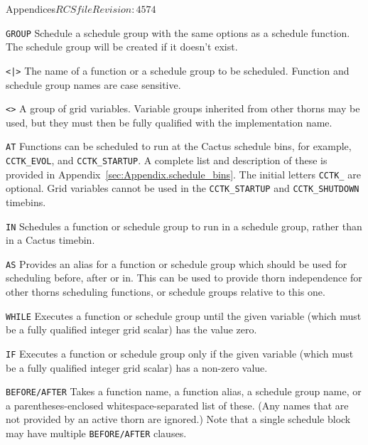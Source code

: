 \begin{cactuspart}{Appendices}{$RCSfile$}{$Revision: 4574 $}
\begin{Lentry}
  \item[{\tt GROUP}] Schedule a schedule group with the same options
  as a schedule function.  The schedule group will be created if it doesn't exist.

  \item[{\tt <\var{function name}|\var{group name}>}] The name of a function or a
  schedule group to be scheduled.  Function and schedule group names
  are case sensitive.

  \item[{\tt <\var{group}>}] A group of grid variables. Variable groups
  inherited from other thorns may be used, but they must then be fully
  qualified with the implementation name.

  \item[{\tt AT}] Functions can be scheduled to run at the Cactus
  schedule bins, for example, {\tt CCTK\_EVOL}, and {\tt CCTK\_STARTUP}. A
  complete list and description of these is provided in
  Appendix~\ref{sec:Appendix.schedule_bins}.  The initial letters
  {\tt CCTK\_} are optional. Grid variables cannot be used in the
  {\tt CCTK\_STARTUP} and {\tt CCTK\_SHUTDOWN} timebins.

  \item[{\tt IN}] Schedules a function or schedule group to run in a
  schedule group, rather than in a Cactus timebin.

  \item[{\tt AS}] Provides an alias for a function or schedule group
  which should be used for scheduling before, after or in.  This can
  be used to provide thorn independence for other thorns scheduling
  functions, or schedule groups relative to this one.

  \item[{\tt WHILE}] Executes a function or schedule group until the given
    variable (which must be a fully qualified integer grid scalar) has
    the value zero.

  \item[{\tt IF}] Executes a function or schedule group only if the given
    variable (which must be a fully qualified integer grid scalar) has
    a non-zero value.

  \item[{\tt BEFORE/AFTER}] Takes a function name, a function alias,
  a schedule group name, or a parentheses-enclosed whitespace-separated
  list of these.  (Any names that are not provided by an active thorn
  are ignored.)  Note that a single schedule block may have multiple
  {\tt BEFORE/AFTER} clauses.


\end{Lentry}
\end{cactuspart}
